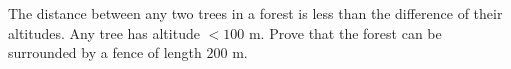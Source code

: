 The distance between any two trees in a forest is less than the difference of their altitudes. Any tree has altitude $< 100$ m. Prove that the forest can be surrounded by a fence of length $200$ m.

